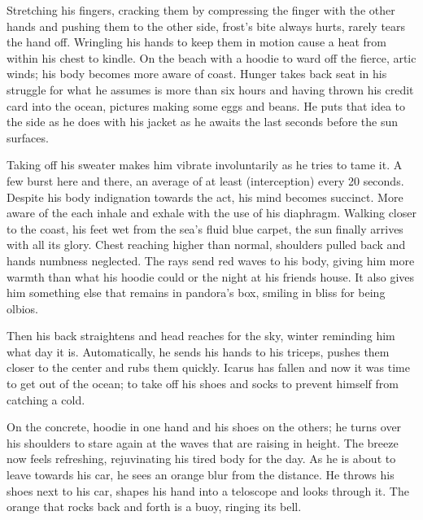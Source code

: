 \begin{Document}
        Stretching his fingers, cracking them by compressing the finger with the other hands and pushing them to the other side, frost's bite always hurts, rarely
    tears the hand off. Wringling his hands to keep them in motion cause a heat from within his chest to kindle. On the beach with a hoodie to ward off the fierce,
    artic winds; his body becomes more aware of coast. Hunger takes back seat in his struggle for what he assumes is more than six hours and having thrown his
    credit card into the ocean, pictures making some eggs and beans. He puts that idea to the side as he does with his jacket as he awaits the last seconds before
    the sun surfaces.

       Taking off his sweater makes him vibrate involuntarily as he tries to tame it. A few burst here and there, an average of at least (interception) every
    20 seconds. Despite his body indignation towards the act, his mind becomes succinct. More aware of the each inhale and exhale with the use of his diaphragm.
    Walking closer to the coast, his feet wet from the sea's fluid blue carpet, the sun finally arrives with all its glory. Chest reaching higher than normal,
    shoulders pulled back and hands numbness neglected. The rays send red waves to his body, giving him more warmth than what his hoodie could or the night
    at his friends house. It also gives him something else that remains in pandora's box, smiling in bliss for being olbios.

        Then his back straightens and head reaches for the sky, winter reminding him what day it is. Automatically, he sends his hands to his triceps, pushes them
    closer to the center and rubs them quickly. Icarus has fallen and now it was time to get out of the ocean; to take off his shoes and socks to prevent himself
    from catching a cold. 

        On the concrete, hoodie in one hand and his shoes on the others; he turns over his shoulders to stare again at the waves that are raising in height. The
    breeze now feels refreshing, rejuvinating his tired body for the day. As he is about to leave towards his car, he sees an orange blur from the distance. He
    throws his shoes next to his car, shapes his hand into a teloscope and looks through it. The orange that rocks back and forth is a buoy, ringing its bell.
\end{Document}
